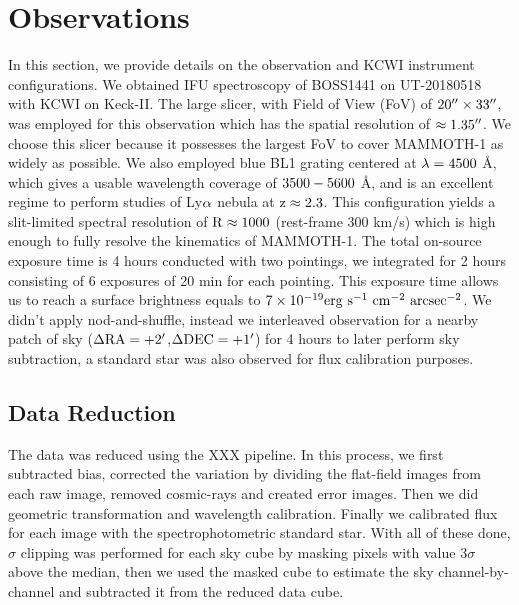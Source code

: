 \section{Observations}
\label{sec:observations}
In this section, we provide details on the observation and KCWI instrument configurations. We obtained IFU spectroscopy of BOSS1441 on UT-20180518 with KCWI on Keck-II. The large slicer, with Field of View (FoV) of $\rm 20\mbox{$^{\prime\prime}$} \times 33\mbox{$^{\prime\prime}$}$, was employed for this observation which has the spatial resolution of $\rm \approx 1.35\mbox{$^{\prime\prime}$}$. We choose this slicer because it possesses the largest FoV to cover MAMMOTH-1 as widely as possible. We also employed blue BL1 grating centered at $\rm \lambda=4500$ \AA, which gives a usable wavelength coverage of $\rm 3500-5600$ \AA, and is an excellent regime to perform studies of Ly$\rm \alpha$ nebula at $\rm z\approx 2.3$. This configuration yields a slit-limited spectral resolution of $\rm R \approx 1000$ (rest-frame 300 km/s) which is high enough to fully resolve the kinematics of MAMMOTH-1. The total on-source exposure time is 4 hours conducted with two pointings, we integrated for 2 hours consisting of 6 exposures of 20 min for each pointing. This exposure time allows us to reach a surface brightness equals to $\rm 7\times 10^{-19}\rm erg \ s^{-1} \ cm^{-2} \ arcsec^{-2}$. We didn't apply nod-and-shuffle, instead we interleaved observation for a nearby patch of sky ($\rm \Delta RA=+2\mbox{$^\prime$}$,$\rm \Delta DEC=+1\mbox{$^\prime$}$) for 4 hours to later perform sky subtraction, a standard star was also observed for flux calibration purposes.

\subsection{Data Reduction}
The data was reduced using the XXX pipeline. In this process, we first subtracted bias, corrected the variation by dividing the flat-field images from each raw image, removed cosmic-rays and created error images. Then we did geometric transformation and wavelength calibration. Finally we calibrated flux for each image with the spectrophotometric standard star. With all of these done, $\sigma$ clipping was performed for each sky cube by masking pixels with value $3\sigma$ above the median, then we used the masked cube to estimate the sky channel-by-channel and subtracted it from the reduced data cube. 
 
